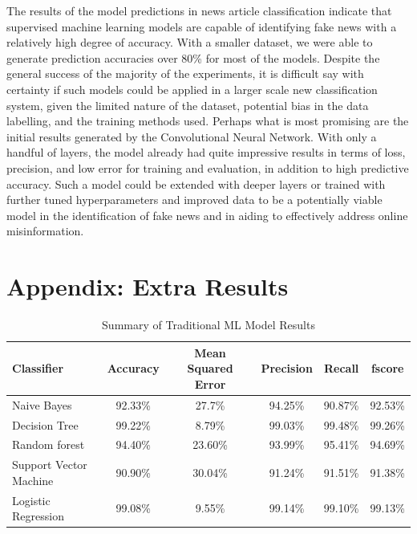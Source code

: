 \documentclass[10pt,twocolumn,letterpaper]{article}
\begin{document}
The results of the model predictions in news article classification indicate that supervised machine learning models are capable of identifying fake news with a relatively high degree of accuracy. With a smaller dataset, we were able to generate prediction accuracies over 80\% for most of the models. Despite the general success of the majority of the experiments, it is difficult say with certainty if such models could be applied in a larger scale new classification system, given the limited nature of the dataset, potential bias in the data labelling, and the training methods used. Perhaps what is most promising are the initial results generated by the Convolutional Neural Network. With only a handful of layers, the model already had quite impressive results in terms of loss, precision, and low error for training and evaluation, in addition to high predictive accuracy. Such a model could be extended with deeper layers or trained with further tuned hyperparameters and improved data to be a potentially viable model in the identification of fake news and in aiding to effectively address online misinformation.
{\small
\raggedright


}

\newpage
\appendix
\onecolumn
\section*{Appendix: Extra Results}\centering
\begin{table}[!hb]\centering
   \begin{center}
   \begin{tabular}{|l|c|c|c|c|c|}
   \hline
    Classifier & Accuracy & Mean Squared Error & Precision & Recall & fscore\\
   \hline\hline
   Naive Bayes & 92.33\% & 27.7\% & 94.25\% & 90.87\% & 92.53\% \\
   Decision Tree & 99.22\% & 8.79\% & 99.03\% & 99.48\% & 99.26\% \\
   Random forest & 94.40\% & 23.60\% & 93.99\% & 95.41\% & 94.69\%\\
   Support Vector Machine & 90.90\% & 30.04\% & 91.24\% & 91.51\% & 91.38\% \\
   Logistic Regression & 99.08\% & 9.55\% & 99.14\% & 99.10\% & 99.13\% \\
   \hline
   \end{tabular}
   \end{center}
   \caption{Summary of Traditional ML Model Results\label{first_table}}
\end{table}
\end{document}
